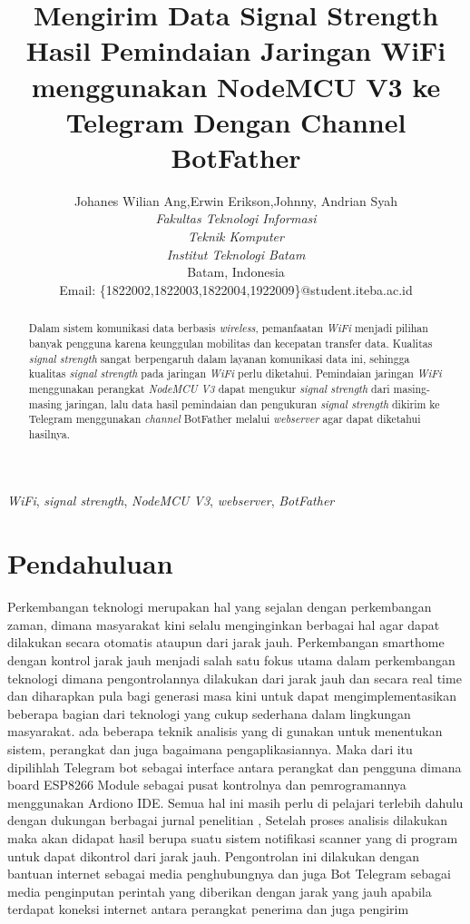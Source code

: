 \documentclass[conference]{IEEEtran}
\title{Mengirim Data Signal Strength Hasil Pemindaian Jaringan WiFi menggunakan NodeMCU V3 ke Telegram Dengan Channel BotFather}
\author{Johanes Wilian Ang\IEEEauthorrefmark{1},Erwin Erikson\IEEEauthorrefmark{2},Johnny\IEEEauthorrefmark{3}, Andrian Syah\IEEEauthorrefmark{4}\\
\textit{Fakultas Teknologi Informasi}\\
\textit{Teknik Komputer}\\
\textit{Institut Teknologi Batam}\\
Batam, Indonesia\\
Email: \{\IEEEauthorrefmark{1}1822002,\IEEEauthorrefmark{2}1822003,\IEEEauthorrefmark{3}1822004,\IEEEauthorrefmark{4}1922009\}@student.iteba.ac.id}
\begin{document}
\maketitle

\begin{abstract}
    Dalam sistem komunikasi data berbasis \emph{wireless}, pemanfaatan \emph{WiFi} 
    menjadi pilihan banyak pengguna karena keunggulan mobilitas dan kecepatan transfer data.
    Kualitas \emph{signal strength} sangat berpengaruh dalam layanan komunikasi data ini, 
    sehingga kualitas \emph{signal strength} pada jaringan \emph{WiFi} perlu diketahui.
    Pemindaian jaringan \emph{WiFi} menggunakan perangkat \emph{NodeMCU V3} dapat mengukur \emph{signal strength} dari 
    masing-masing jaringan, lalu data hasil pemindaian dan pengukuran \emph{signal strength} dikirim ke
    Telegram menggunakan \emph{channel} BotFather melalui \emph{webserver} agar dapat diketahui hasilnya.
\end{abstract}

\begin{IEEEkeywords}
    \emph{WiFi}, \emph{signal strength}, \emph{NodeMCU V3}, \emph{webserver}, \emph{BotFather}
\end{IEEEkeywords}

\section{Pendahuluan}
\vspace{0.1cm}
Perkembangan teknologi merupakan hal yang sejalan dengan 
perkembangan zaman, dimana masyarakat kini selalu
menginginkan berbagai hal agar dapat dilakukan secara otomatis
ataupun dari jarak jauh. Perkembangan smarthome dengan
kontrol jarak jauh menjadi salah satu fokus utama dalam
perkembangan teknologi dimana pengontrolannya dilakukan dari
jarak jauh dan secara real time dan diharapkan pula bagi generasi
masa kini untuk dapat mengimplementasikan beberapa bagian
dari teknologi yang cukup sederhana dalam lingkungan masyarakat. ada
beberapa teknik analisis yang di gunakan untuk menentukan
sistem, perangkat dan juga bagaimana pengaplikasiannya. Maka
dari itu dipilihlah Telegram bot sebagai interface antara perangkat
dan pengguna dimana board ESP8266 Module sebagai pusat
kontrolnya dan pemrogramannya menggunakan Ardiono IDE.
Semua hal ini masih perlu di pelajari terlebih dahulu dengan
dukungan berbagai jurnal penelitian ,
Setelah proses analisis dilakukan maka akan didapat hasil
berupa suatu sistem notifikasi scanner yang di program untuk dapat
dikontrol dari jarak jauh. Pengontrolan ini dilakukan dengan
bantuan internet sebagai media penghubungnya dan juga Bot
Telegram sebagai media penginputan perintah yang diberikan
dengan jarak yang jauh apabila terdapat koneksi internet 
antara perangkat penerima dan juga pengirim 
\end{document}
